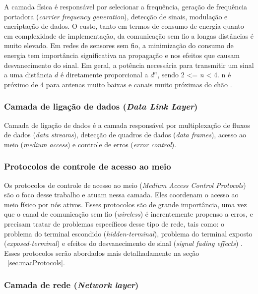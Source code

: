  A camada física é responsável por selecionar a frequência, geração de frequência portadora (\textit{carrier frequency generation}), detecção de sinais, modulação e encriptação de dados. O custo, tanto em termos de consumo de energia quanto em complexidade de implementação, da comunicação sem fio a longas distâncias é muito elevado. Em redes de sensores sem fio, a minimização do consumo de energia tem importância significativa na propagação e nos efeitos que causam desvanecimento do sinal. Em geral, a potência necessária para transmitir um sinal a uma distância \textit{$d$} é diretamente proporcional a \textit{$d^{n}$}, sendo 2 <= \textit{n} < 4. n é próximo de 4 para antenas muito baixas e canais muito próximas do chão \cite{Pottie2000}.
 
 \subsubsection{Camada de ligação de dados (\textit{Data Link Layer}) }
 
 Camada de ligação de dados é a camada responsável por multiplexação de fluxos de dados (\textit{data streams}), detecção de quadros de dados (\textit{data frames}), acesso ao meio (\textit{medium access}) e controle de erros (\textit{error control}).
 
 \subsubsection*{Protocolos de controle de acesso ao meio}
 
Os protocolos de controle de acesso ao meio (\textit{Medium Access Control Protocols}) são o foco desse trabalho e atuam nessa camada. Eles coordenam o acesso ao meio físico por nós ativos. Esses protocolos são de grande importância, uma vez que o canal de comunicação sem fio (\textit{wireless}) é inerentemente propenso a erros, e precisam tratar de problemas específicos desse tipo de rede, tais como: o problema do terminal escondido (\textit{hidden-terminal}), problema do terminal exposto (\textit{exposed-terminal}) e efeitos do desvanecimento de sinal (\textit{signal fading effects}) \cite{Kumar06mediumaccess}. Esses protocolos serão abordados mais detalhadamente na seção ~\ref{sec:macProtocols}.

 
 \subsubsection{Camada de rede (\textit{Network layer})} 
 
